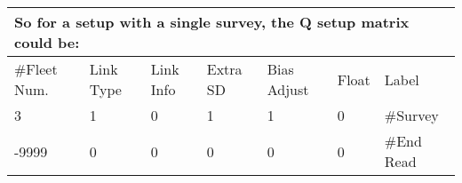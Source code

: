\begin{enumerate}
\end{enumerate}



\begin{longtable}{p{2cm} p{2cm} p{2cm} p{2cm} p{2cm} p{1.3cm} p{2.3cm}}
		\multicolumn{7}{l}{So for a setup with a single survey, the Q setup matrix could be:}\\
		\hline
	    \#Fleet Num. & Link Type & Link Info & Extra SD & Bias Adjust & Float  & Label \\
	    \hline
	    3 & 1 & 0 & 1 & 1 & 0 & \#Survey  \\
	    -9999 & 0 & 0 & 0 & 0 & 0 & \#End Read \\
	    \hline
\end{longtable}


